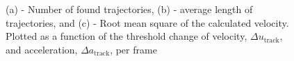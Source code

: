 \begin{figure}[!ht]
	\centering
{}
	\caption{(a) - Number of found trajectories, (b) - average length of trajectories, and (c) - Root mean square of the calculated velocity. Plotted as a function of the threshold change of velocity, $\Delta u_{\mathrm{track}}$, and acceleration, $\Delta a_{\mathrm{track}}$, per frame \label{fig:tracking_params}}
\end{figure}

